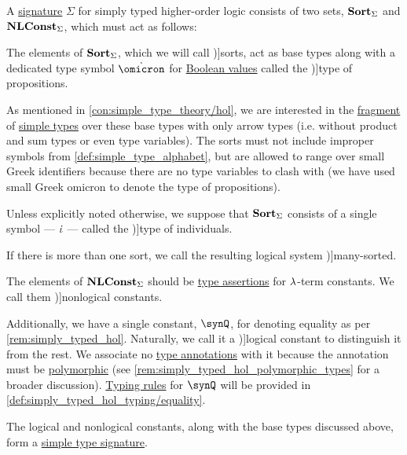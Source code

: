 \begin{definition}\label{def:simply_typed_hol_signature}\mimprovised
  A \hyperref[con:improper_symbol]{signature} \( \Sigma \) for simply typed higher-order logic consists of two  sets, \( \op*{Sort}_\Sigma \) and \( \op*{NLConst}_\Sigma \), which must act as follows:
  \begin{thmenum}
     The elements of \( \op*{Sort}_\Sigma \), which we will call \term[en=sorts (\cite[35]{BaaderNipkow2012TermRewriting})]{sorts}, act as base types along with a dedicated type symbol \( \syn\omicron \) for \hyperref[con:boolean_value]{Boolean values} called the \term[en=type of propositions (\cite[56]{Church1940STT})]{type of propositions}.

    As mentioned in \cref{con:simple_type_theory/hol}, we are interested in the \hyperref[con:syntax_fragment]{fragment} of \hyperref[def:simple_type]{simple types} over these base types with only arrow types (i.e. without product and sum types or even type variables). The sorts must not include improper symbols from \cref{def:simple_type_alphabet}, but are allowed to range over small Greek identifiers because there are no type variables to clash with (we have used small Greek omicron to denote the type of propositions).

    Unless explicitly noted otherwise, we suppose that \( \op*{Sort}_\Sigma \) consists of a single symbol --- \( \dot{\iota} \) --- called the \term[en=type of individuals (\cite[56]{Church1940STT})]{type of individuals}.

    If there is more than one sort, we call the resulting logical system \term[en=many-sorted predicate logic (\cite[\S 4.4.13]{TroelstraSchwichtenberg2000BasicProofTheory})]{many-sorted}.

     The elements of \( \op*{NLConst}_\Sigma \) should be \hyperref[def:type_assertion]{type assertions} for  \( {\mathrm \lambda} \)-term constants. We call them \term[en=nonlogical constants (\cite[211]{Andrews2002Logic})]{nonlogical constants}.

    Additionally, we have a single constant, \( \synQ \), for denoting equality as per \cref{rem:simply_typed_hol}. Naturally, we call it a \term[en=logical constants (\cite[211]{Andrews2002Logic})]{logical constant} to distinguish it from the rest. We associate no \hyperref[con:type_annotation]{type annotations} with it because the annotation must be \hyperref[def:polymorphic_typed_lambda_calculus]{polymorphic} (see \cref{rem:simply_typed_hol_polymorphic_types} for a broader discussion). \hyperref[con:typing_rule]{Typing rules} for \( \synQ \) will be provided in \cref{def:simply_typed_hol_typing/equality}.

    The logical and nonlogical constants, along with the base types discussed above, form a \hyperref[def:simple_type_signature]{simple type signature}.
  \end{thmenum}
\end{definition}
